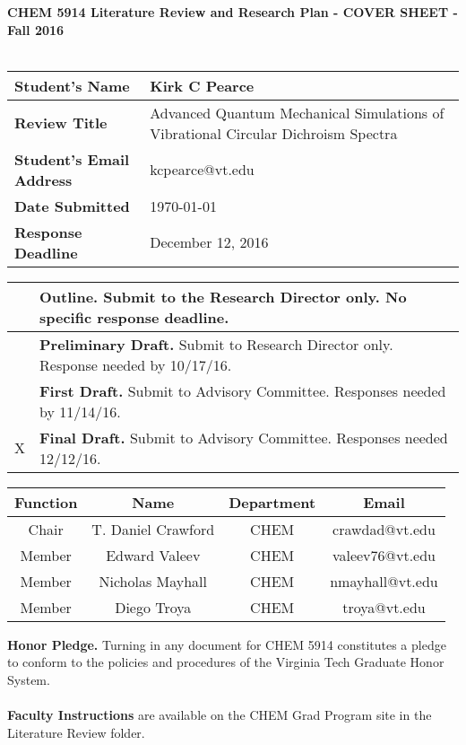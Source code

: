 
\begin{table}
\centering
{\bf CHEM 5914 Literature Review and Research Plan - COVER SHEET - Fall 2016} \\~\\
\renewcommand{\arraystretch}{1.5}
\begin{tabular}{|l|l|}
    \hline
    {\bf Student's Name} & Kirk C Pearce \\
    \hline
    {\bf Review Title} & \multicolumn{1}{m{10cm}|}{Advanced Quantum Mechanical Simulations of Vibrational Circular Dichroism Spectra} \\
    \hline
    {\bf Student's Email Address} & kcpearce@vt.edu \\
    \hline
    {\bf Date Submitted} & \today \\
    \hline
    {\bf Response Deadline} & December 12, 2016 \\
    \hline
\end{tabular}

\vspace{10mm}

\begin{tabular}{|c|l|}
    \hline
    & {\bf Outline.} Submit to the Research Director only. No specific response deadline. \\
    \hline
    & {\bf Preliminary Draft.} Submit to Research Director only. Response needed by 10/17/16. \\
    \hline
    & {\bf First Draft.} Submit to Advisory Committee. Responses needed by 11/14/16. \\
    \hline
    X & {\bf Final Draft.} Submit to Advisory Committee. Responses needed 12/12/16. \\
    \hline
\end{tabular}

\vspace{10mm}

\begin{tabular}{|c|c|c|c|}
    \hline
    {\bf Function} & {\bf Name} & {\bf Department} & {\bf Email} \\
    \hline
    Chair & T. Daniel Crawford & CHEM & crawdad@vt.edu \\
    \hline
    Member & Edward Valeev & CHEM & valeev76@vt.edu \\
    \hline
    Member & Nicholas Mayhall & CHEM & nmayhall@vt.edu \\
    \hline
    Member & Diego Troya & CHEM & troya@vt.edu \\
    \hline
\end{tabular}
\end{table}
\begin{singlespacing}
\noindent
{\bf Honor Pledge.} Turning in any document for CHEM 5914 constitutes a pledge to conform to the policies and procedures of the Virginia Tech Graduate Honor System. \\~\\
{\bf Faculty Instructions} are available on the CHEM Grad Program site in the Literature Review folder.
\end{singlespacing}




